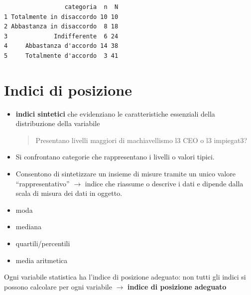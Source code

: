 \documentclass[
  a4paper,
  DIV=11,
  numbers=noendperiod]{scrreprt}
\begin{document}
\begin{verbatim}
                 categoria  n  N
1 Totalmente in disaccordo 10 10
2 Abbastanza in disaccordo  8 18
3             Indifferente  6 24
4     Abbastanza d'accordo 14 38
5     Totalmente d'accordo  3 41
\end{verbatim}

\section{Indici di posizione}\label{indici-di-posizione}

\begin{itemize}
\item \textbf{indici sintetici} che evidenziano le caratteristiche essenziali della distribuzione della variabile
    
\vspace{3mm}

\begin{quote}

Presentano livelli maggiori di machiavellismo l3 CEO o l3 impiegat3?
\end{quote}
\vspace{3mm} 

\item Si confrontano categorie che rappresentano i livelli o valori tipici.

\item Consentono di sintetizzare un insieme di misure tramite un unico valore ``rappresentativo'' $\rightarrow$ indice che riassume o descrive i dati e dipende dalla scala di misura dei dati in oggetto.
\end{itemize}

\begin{itemize}
\item moda
\item mediana
\item quartili/percentili
\item media aritmetica
\end{itemize}

Ogni variabile statistica ha l'indice di posizione adeguato: non tutti
gli indici si possono calcolare per ogni variabile \(\rightarrow\)
\textbf{indice di posizione adeguato}
\end{document}
